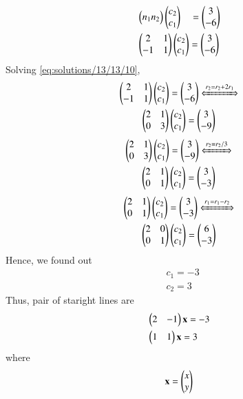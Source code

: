 \begin{align}
& \begin{pmatrix} n_1 n_2\end{pmatrix} \begin{pmatrix}c_2 \\ c_1\end{pmatrix} \quad= \begin{pmatrix}3\\-6\end{pmatrix} \\
& \begin{pmatrix}2 &1 \\ -1 &1\end{pmatrix} \begin{pmatrix}c_2 \\ c_1\end{pmatrix} = \begin{pmatrix}3\\-6\end{pmatrix}\label{eq:solutions/13/13/10}
\end{align}
Solving \eqref{eq:solutions/13/13/10},
\begin{multline}
\myvec{2 &1 \\ -1 &1} \myvec{c_2 \\ c_1} = \myvec{3\\-6} \xLeftrightarrow[]{r_2 = r_2 + 2r_1} \\
\myvec{2 &1 \\ 0 &3} \myvec{c_2 \\ c_1} = \myvec{3\\-9}
\end{multline}
\begin{multline}
	\myvec{2 &1 \\ 0 &3} \myvec{c_2 \\ c_1} = \myvec{3\\-9} \xLeftrightarrow[]{r_2 = r_2/3} \\
	\myvec{2 &1 \\ 0 &1} \myvec{c_2 \\ c_1} = \myvec{3\\-3}
\end{multline}
\begin{multline}
	\myvec{2 &1 \\ 0 &1} \myvec{c_2 \\ c_1} = \myvec{3\\-3} \xLeftrightarrow[]{r_1 = r_1-r_2} \\
	\myvec{2 &0 \\ 0 &1} \myvec{c_2 \\ c_1} = \myvec{6\\-3}
\end{multline}
Hence, we found out
\begin{align}
	&c_1 = -3 \\
	&c_2 = 3
\end{align}
Thus, pair of staright lines are
\begin{align}
& \begin{pmatrix}2 &-1\end{pmatrix}\mathbf{x} = -3 \\
& \begin{pmatrix}1 &1\end{pmatrix}\mathbf{x} = 3 
\end{align}
where
\begin{align}
\mathbf{x} = \begin{pmatrix}x \\ y\end{pmatrix}	
\end{align}
